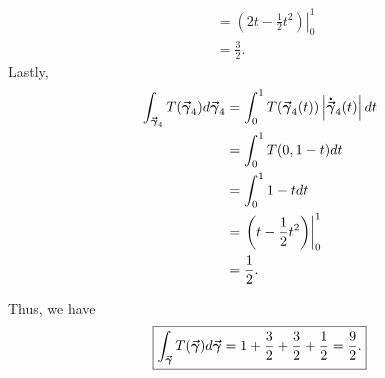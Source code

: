\documentclass[12pt]{article} %
\begin{document}
\begin{solution}
\begin{enumerate}[(a)]
\begin{align*}
				&= \left.\left( 2t-\frac{1}{2}t^2\right)\right\vert_0^1\\
				&= \frac{3}{2}.
		\end{align*}			
		Lastly,
		\begin{align*}
			\int_{\boldsymbol{\vec{\gamma}}_4} T(\boldsymbol{\vec{\gamma}}_4) d\boldsymbol{\vec{\gamma}}_4 &= \int_0^1 T(\boldsymbol{\vec{\gamma}}_4(t))\left|\boldsymbol{\dot{\vec{\gamma}}}_4(t)\right|dt\\
			&= \int_0^1 T(0,1-t) dt\\
			&= \int_0^1 1-t dt\\
			&= \left.\left(t-\frac{1}{2}t^2\right)\right\vert_0^1\\
			&= \frac{1}{2}.
		\end{align*}	
	\end{enumerate}
	Thus, we have
	\[
	\boxed{\int_{\boldsymbol{\vec{\gamma}}} T(\boldsymbol{\vec{\gamma}}) d\boldsymbol{\vec{\gamma}} = 1+\frac{3}{2}+\frac{3}{2}+\frac{1}{2} = \frac{9}{2}.}
	\]
\end{solution}
\end{document}
